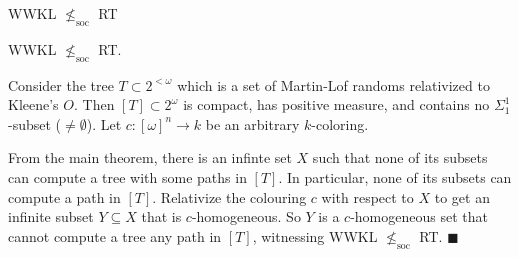 \begin{frame}{WWKL $\nleq_{\text{soc}}$ RT}
  \begin{theorem}
    WWKL $\nleq_{\text{soc}}$ RT.
  \end{theorem}

  Consider the tree $T\subset2^{<\omega}$ which is a set of Martin-Lof
  randoms relativized to Kleene's $O$. Then $[T]\subset 2^\omega$ is
  compact, has positive measure, and contains no $\Sigma_1^1$-subset
  ($\neq\emptyset$). Let $c:[\omega]^n\rightarrow k$ be an arbitrary
  $k$-coloring.
  
  \vspace{1em}
  From the main theorem, there is an infinte set $X$ such that none of its
  subsets can compute a tree with some paths in $[T]$. In particular, none
  of its subsets can compute a path in $[T]$. Relativize the
  colouring $c$ with respect to $X$ to get an infinite subset $Y\subseteq
  X$ that is $c$-homogeneous. So $Y$ is a $c$-homogeneous set that cannot
  compute a tree any path in $[T]$, witnessing WWKL $\nleq_{\text{soc}}$
  RT. $\blacksquare$
\end{frame}
